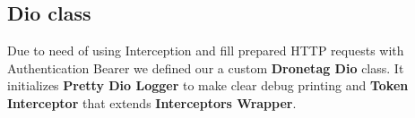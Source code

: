 \subsection{Dio class}\label{subsec:dio-class}
Due to need of using Interception and fill prepared HTTP requests with Authentication Bearer we defined our a custom \textbf{Dronetag Dio} class.
It initializes \textbf{Pretty Dio Logger} to make clear debug printing and \textbf{Token Interceptor} that extends \textbf{Interceptors Wrapper}.
